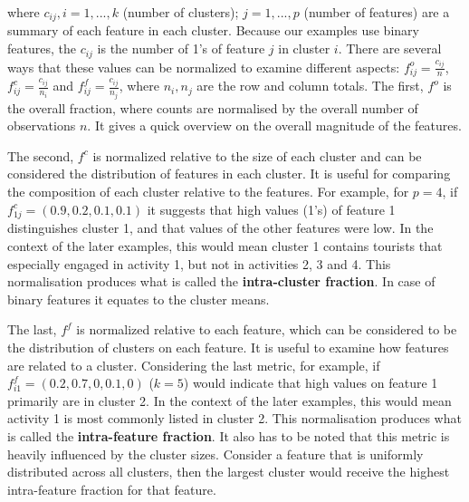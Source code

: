 \documentclass[article]{ajs}
\begin{document}
where $c_{ij}, i=1, ..., k$ (number of clusters); $j=1, ..., p$ (number of features) are a summary of each feature in each cluster. Because our examples use binary features,  the $c_{ij}$ is the number of 1's of feature $j$ in cluster $i$. %
There are several ways that these values can be normalized to examine different aspects: $f_{ij}^{o} = \frac{c_{ij}}{n}$, $f_{ij}^{c} = \frac{c_{ij}}{n_{i}}$ and $f_{ij}^{f} = \frac{c_{ij}}{n_{j}}$, where $n_i, n_j$ are the row and column totals. The first, $f^{o}$ is the overall fraction, where counts are normalised by the overall number of observations $n$. It gives a quick overview on the overall magnitude of the features.

The second, $f^c$ is normalized relative to the size of each cluster and can be considered the distribution of features in each cluster. It is useful for comparing the composition of each cluster relative to the features. For example, for $p=4$, if $f^c_{1j} = (0.9, 0.2, 0.1, 0.1)$ it suggests that high values (1's) of feature 1 distinguishes cluster 1, and that values of the other  features were low. In the context of the later examples, this would mean cluster 1 contains tourists that especially engaged in activity 1, but not in activities 2, 3 and 4. This normalisation produces what is called the {\bf intra-cluster fraction}. In case of binary features it equates to the cluster means.

The last, $f^f$ is normalized relative to each feature, which can be considered to be the distribution of clusters on each feature. It is useful to examine how features are related to a cluster. Considering the last metric, for example, if $f^f_{i1} = (0.2, 0.7, 0, 0.1, 0)$ ($k=5$) would indicate that high values on feature 1 primarily are in cluster 2. In the context of the later examples, this would mean activity 1 is most commonly listed in cluster 2. This normalisation produces what is called the {\bf intra-feature fraction}. It also has to be noted that this metric is heavily influenced by the cluster sizes. Consider a feature that is uniformly distributed across all clusters, then the largest cluster would receive the highest intra-feature fraction for that feature.
\end{document}
